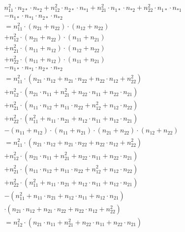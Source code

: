 \documentclass{article}
\begin{document}
    \begin{multline*}
       \\ n_{11}^{2} \cdot n_{2*} \cdot n_{*2} + n_{12}^{2} \cdot n_{2*} \cdot n_{*1}
       + n_{21}^{2} \cdot n_{1*} \cdot n_{*2} + n_{22}^{2} \cdot n_{1*} \cdot n_{*1} \\
       - n_{1*} \cdot n_{*1} \cdot n_{2*} \cdot n_{*2} \\
       = n_{11}^{2} \cdot (n_{21} + n_{22}) \cdot (n_{12} + n_{22}) \\
       + n_{12}^{2} \cdot (n_{21} + n_{22}) \cdot (n_{11} + n_{21}) \\
       + n_{21}^{2} \cdot (n_{11} + n_{12}) \cdot (n_{12} + n_{22}) \\
       + n_{22}^{2} \cdot (n_{11} + n_{12}) \cdot (n_{11} + n_{21}) \\
       - n_{1*} \cdot n_{*1} \cdot n_{2*} \cdot n_{*2} \\
       = n_{11}^{2} \cdot (n_{21} \cdot n_{12} + n_{21} \cdot n_{22} + n_{22} \cdot n_{12} + n_{22}^{2}) \\
       + n_{12}^{2} \cdot (n_{21} \cdot n_{11} + n_{21}^{2} + n_{22} \cdot n_{11} + n_{22} \cdot n_{21}) \\
       + n_{21}^{2} \cdot (n_{11} \cdot n_{12} + n_{11} \cdot n_{22} + n_{12}^{2} + n_{12} \cdot n_{22}) \\
       + n_{22}^{2} \cdot (n_{11}^{2} + n_{11} \cdot n_{21} + n_{12} \cdot n_{11} + n_{12} \cdot n_{21}) \\
       - (n_{11} + n_{12}) \cdot (n_{11} + n_{21}) \cdot (n_{21} + n_{22}) \cdot (n_{12} + n_{22}) \\
       = n_{11}^{2} \cdot (n_{21} \cdot n_{12} + n_{21} \cdot n_{22} + n_{22} \cdot n_{12} + n_{22}^{2}) \\
       + n_{12}^{2} \cdot (n_{21} \cdot n_{11} + n_{21}^{2} + n_{22} \cdot n_{11} + n_{22} \cdot n_{21}) \\
       + n_{21}^{2} \cdot (n_{11} \cdot n_{12} + n_{11} \cdot n_{22} + n_{12}^{2} + n_{12} \cdot n_{22}) \\
       + n_{22}^{2} \cdot (n_{11}^{2} + n_{11} \cdot n_{21} + n_{12} \cdot n_{11} + n_{12} \cdot n_{21}) \\
       - (n_{11}^{2} + n_{11} \cdot n_{21} + n_{12} \cdot n_{11} + n_{12} \cdot n_{21}) \\
       \cdot (n_{21} \cdot n_{12} + n_{21} \cdot n_{22} + n_{22} \cdot n_{12} + n_{22}^{2}) \\
       = n_{12}^{2} \cdot (n_{21} \cdot n_{11} + n_{21}^{2} + n_{22} \cdot n_{11} + n_{22} \cdot n_{21}) \\

\end{multline*}
\end{document}
